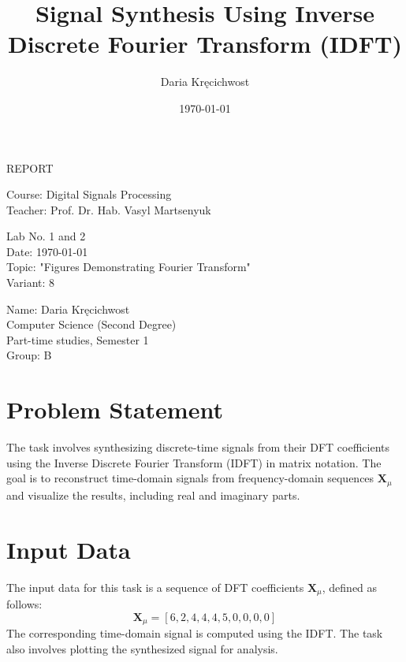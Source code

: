 \documentclass[12pt]{article}
\title{Signal Synthesis Using Inverse Discrete Fourier Transform (IDFT)}
\author{Daria Kręcichwost}
\date{\today}
\begin{document}
\begin{titlepage}
    \centering
    \vspace*{2cm}
    
    \Huge
    REPORT
    
    \vspace{1cm}
    
    \Large
    Course: Digital Signals Processing \\
    Teacher: Prof. Dr. Hab. Vasyl Martsenyuk
    
    \vfill
    
    \Large
    Lab No. 1 and 2\\
    Date: \today \\
    Topic: "Figures Demonstrating Fourier Transform" \\
    Variant: 8
    
    \vspace{1cm}
    
    \large
    Name: Daria Kręcichwost \\
    Computer Science (Second Degree) \\
    Part-time studies, Semester 1 \\
    Group: B
\end{titlepage}

\newpage

\maketitle


\section{Problem Statement}
The task involves synthesizing discrete-time signals from their DFT coefficients using the Inverse Discrete Fourier Transform (IDFT) in matrix notation. The goal is to reconstruct time-domain signals from frequency-domain sequences \( \mathbf{X}_\mu \) and visualize the results, including real and imaginary parts.

\section{Input Data}
The input data for this task is a sequence of DFT coefficients \( \mathbf{X}_\mu \), defined as follows:
\[
\mathbf{X}_\mu = [6, 2, 4, 4, 4, 5, 0, 0, 0, 0]
\]
The corresponding time-domain signal is computed using the IDFT. The task also involves plotting the synthesized signal for analysis.
\end{document}
